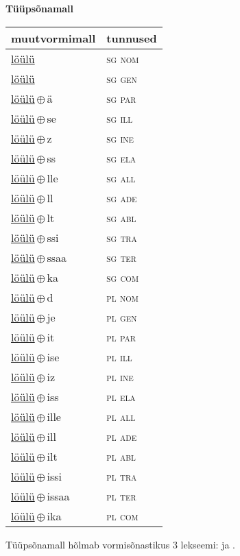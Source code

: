 

\vspace{3.5em}
\noindent \begin{minipage}{\textwidth}
\noindent \textbf{Tüüpsõnamall \,}\\

\begin{sideways}
\begin{tabular}{l l}
muutvormimall & tunnused \\
\hline
\underline{löülü} & \textsc{ sg nom } \\
\underline{löülü} & \textsc{ sg gen } \\
\underline{löülü}\,$\oplus$\,ä & \textsc{ sg par } \\
\underline{löülü}\,$\oplus$\,se & \textsc{ sg ill } \\
\underline{löülü}\,$\oplus$\,z & \textsc{ sg ine } \\
\underline{löülü}\,$\oplus$\,ss & \textsc{ sg ela } \\
\underline{löülü}\,$\oplus$\,lle & \textsc{ sg all } \\
\underline{löülü}\,$\oplus$\,ll & \textsc{ sg ade } \\
\underline{löülü}\,$\oplus$\,lt & \textsc{ sg abl } \\
\underline{löülü}\,$\oplus$\,ssi & \textsc{ sg tra } \\
\underline{löülü}\,$\oplus$\,ssaa & \textsc{ sg ter } \\
\underline{löülü}\,$\oplus$\,ka & \textsc{ sg com } \\
\underline{löülü}\,$\oplus$\,d & \textsc{ pl nom } \\
\underline{löülü}\,$\oplus$\,je & \textsc{ pl gen } \\
\underline{löülü}\,$\oplus$\,it & \textsc{ pl par } \\
\underline{löülü}\,$\oplus$\,ise & \textsc{ pl ill } \\
\underline{löülü}\,$\oplus$\,iz & \textsc{ pl ine } \\
\underline{löülü}\,$\oplus$\,iss & \textsc{ pl ela } \\
\underline{löülü}\,$\oplus$\,ille & \textsc{ pl all } \\
\underline{löülü}\,$\oplus$\,ill & \textsc{ pl ade } \\
\underline{löülü}\,$\oplus$\,ilt & \textsc{ pl abl } \\
\underline{löülü}\,$\oplus$\,issi & \textsc{ pl tra } \\
\underline{löülü}\,$\oplus$\,issaa & \textsc{ pl ter } \\
\underline{löülü}\,$\oplus$\,ika & \textsc{ pl com } \\
\end{tabular}
\end{sideways}
\label{tab:tüüpsõnamall-löülü}

\end{minipage}

 
\vspace{1em}
\noindent Tüüpsõnamall  hõlmab vormisõnastikus 3 lekseemi:  ja .
